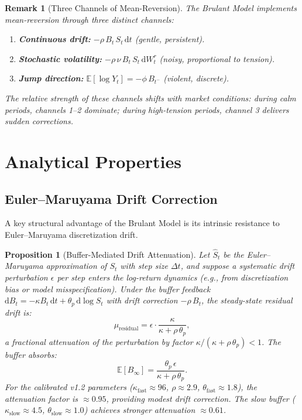 \documentclass[11pt,a4paper]{article}
\newtheorem{proposition}[theorem]{Proposition}
\newtheorem{remark}[theorem]{Remark}
\newcommand{\E}{\mathbb{E}}
\newcommand{\diff}{\mathrm{d}}
\newcommand{\dt}{\diff t}
\begin{document}
\begin{remark}[Three Channels of Mean-Reversion]
The Brulant Model implements mean-reversion through three distinct channels:
\begin{enumerate}[nosep]
  \item \textbf{Continuous drift:} $-\rho\, B_t\, S_t\,\dt$ (gentle, persistent).
  \item \textbf{Stochastic volatility:} $-\rho\,\nu\, B_t\, S_t\,\diff W_t^r$
    (noisy, proportional to tension).
  \item \textbf{Jump direction:} $\E[\log Y_t] = -\phi\, B_{t^-}$ (violent, discrete).
\end{enumerate}
The relative strength of these channels shifts with market conditions:
during calm periods, channels 1--2 dominate; during high-tension periods,
channel 3 delivers sudden corrections.
\end{remark}

\section{Analytical Properties}
\label{sec:properties}

\subsection{Euler--Maruyama Drift Correction}
\label{sec:em_drift}

A key structural advantage of the Brulant Model is its intrinsic resistance
to Euler--Maruyama discretization drift.

\begin{proposition}[Buffer-Mediated Drift Attenuation]
\label{prop:drift_correction}
Let $\hat{S}_t$ be the Euler--Maruyama approximation of $S_t$ with step
size $\Delta t$, and suppose a systematic drift perturbation $\epsilon$
per step enters the log-return dynamics (e.g., from discretization bias or
model misspecification). Under the buffer feedback $\diff B_t = -\kappa B_t\,\dt + \theta_p\,\diff \log S_t$
with drift correction $-\rho\, B_t$, the steady-state residual drift is:
\[
  \mu_{\text{residual}} = \epsilon \cdot \frac{\kappa}{\kappa + \rho\,\theta_p},
\]
a fractional attenuation of the perturbation by factor $\kappa / (\kappa + \rho\,\theta_p) < 1$.
The buffer absorbs:
\[
  \E[B_{\infty}] = \frac{\theta_p\,\epsilon}{\kappa + \rho\,\theta_p}.
\]
For the calibrated v1.2 parameters ($\kappa_{\text{fast}} \approx 96$,
$\rho \approx 2.9$, $\theta_{\text{fast}} \approx 1.8$), the attenuation
factor is $\approx 0.95$, providing modest drift correction. The slow buffer
($\kappa_{\text{slow}} \approx 4.5$, $\theta_{\text{slow}} \approx 1.0$)
achieves stronger attenuation $\approx 0.61$.
\end{proposition}
\end{document}
